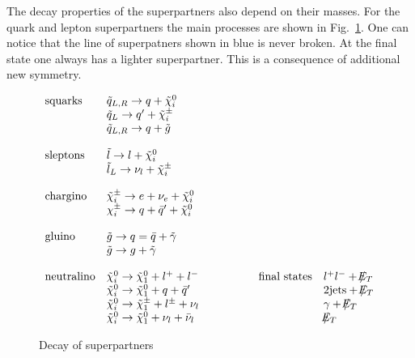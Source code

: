 \documentclass{cernyrep}
\begin{document}
The decay properties of the superpartners also depend on their
masses. For the quark and lepton superpartners the main
processes are shown in Fig.~\ref{decay}. One can notice that the line of superpatners shown in blue is never broken. At the final state one always has a lighter superpartner. This is a consequence of additional  new symmetry.
\begin{figure}[htb]
\begin{center}
$
\begin{array}{llll}
\mbox{squarks} & \tilde q_{L,R}\to q+\tilde \chi^0_i  &&\\
& \tilde q_{L}\to q'+\tilde \chi^\pm_i &&\\
& \tilde q_{L,R}\to q+\tilde g&&\\[4mm]
\mbox{sleptons} & \tilde l\to l+\tilde \chi^0_i &&\\
& \tilde l_{L}\to \nu_l+\tilde \chi^\pm_i &&\\[4mm]
\mbox{chargino}
& \tilde \chi^\pm_i\to e+\nu_e+\tilde \chi^0_i &&\\
& \chi^\pm_i\to q+\bar q'+\tilde \chi^0_i &&\\[4mm]
\mbox{gluino} & \tilde g\to q=\bar q +\tilde \gamma &&\\
& \tilde g\to g+\tilde \gamma &&\\[4mm]
\mbox{neutralino} & \tilde \chi^0_i\to \tilde \chi^0_1+l^+ +l^-
& \hspace{15mm} \mbox{final states} & l^+l^- + \slash \hspace{-0.24cm}E_T\\
& \tilde \chi^0_i\to \tilde \chi^0_1+q +\bar q' & & 2 \mbox{jets} + \slash \hspace{-0.24cm}E_T\\
& \tilde \chi^0_i\to \tilde \chi^\pm_1+l^\pm +\nu_l &  &\gamma + \slash \hspace{-0.24cm}E_T\\
& \tilde \chi^0_i\to \tilde \chi^0_1+\nu_l+\bar \nu_l & & \slash \hspace{-0.24cm}E_T
\end{array}
$
\hspace*{-50mm}
\leavevmode
{}
\end{center}
\vspace{0cm}
\caption{Decay of superpartners}\label{decay}
\end{figure}
\end{document}
